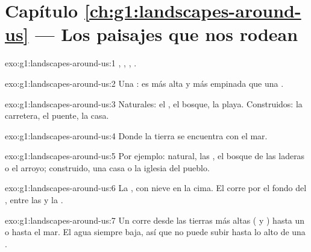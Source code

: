 \section*{Capítulo \ref{ch:g1:landscapes-around-us} --- Los paisajes que nos rodean}

\begin{solution}{exo:g1:landscapes-around-us:1}
, , , .
\end{solution}

\begin{solution}{exo:g1:landscapes-around-us:2}
Una : es más alta y más empinada que una .
\end{solution}

\begin{solution}{exo:g1:landscapes-around-us:3}
Naturales: el , el bosque, la playa. Construidos: la carretera, el
puente, la casa.
\end{solution}

\begin{solution}{exo:g1:landscapes-around-us:4}
Donde la tierra se encuentra con el mar.
\end{solution}

\begin{solution}{exo:g1:landscapes-around-us:5}
Por ejemplo: natural, las , el bosque de las laderas o el arroyo;
construido, una casa o la iglesia del pueblo.
\end{solution}

\begin{solution}{exo:g1:landscapes-around-us:6}
La , con nieve en la cima. El  corre por el fondo del ,
entre las  y la .
\end{solution}

\begin{solution}{exo:g1:landscapes-around-us:7}
Un  corre desde las tierras más altas ( y ) hasta un 
o hasta el mar. El agua siempre baja, así que no puede subir hasta lo alto
de una .
\end{solution}

